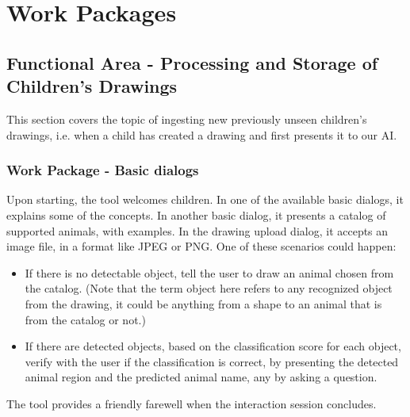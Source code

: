 \section{Work Packages}



\subsection{Functional Area - Processing and Storage of Children's Drawings}
This section covers the topic of ingesting new previously unseen children's drawings, i.e. when a child has created a drawing and first presents it to our AI.

\subsubsection{Work Package - Basic dialogs}
Upon starting, the tool welcomes children.
In one of the available basic dialogs, it explains some of the concepts.
In another basic dialog, it presents a catalog of supported animals, with examples.
In the drawing upload dialog, it accepts an image file, in a format like JPEG or PNG.
One of these scenarios could happen:
\begin{itemize}
\item If there is no detectable object, tell the user to draw an animal chosen from the catalog.
(Note that the term object here refers to any recognized object from the drawing, it could be anything from a shape to an animal that is from the catalog or not.)
\item If there are detected objects, based on the classification score for each object, verify with the user if the classification is correct, by presenting the detected animal region and the predicted animal name, any by asking a question.
\end{itemize}
The tool provides a friendly farewell when the interaction session concludes.

